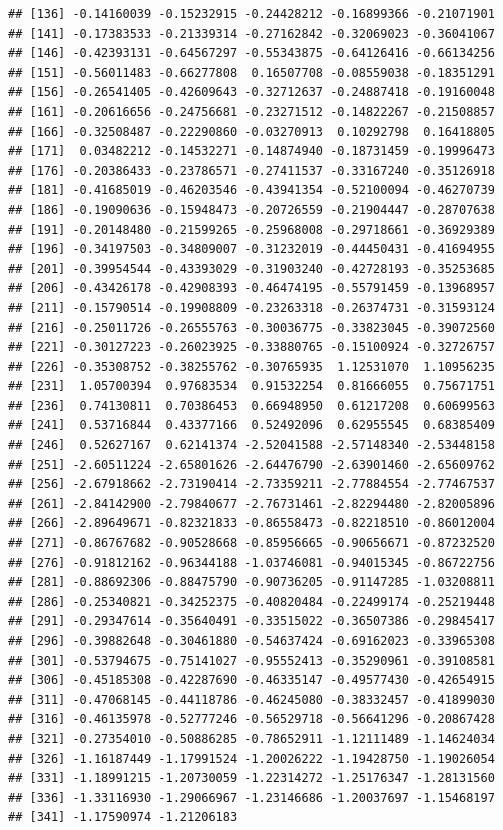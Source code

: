 \documentclass[]{gitbook}
\theoremstyle{definition}
\theoremstyle{definition}
\theoremstyle{definition}
\theoremstyle{remark}
\begin{document}
\begin{verbatim}
## [136] -0.14160039 -0.15232915 -0.24428212 -0.16899366 -0.21071901
## [141] -0.17383533 -0.21339314 -0.27162842 -0.32069023 -0.36041067
## [146] -0.42393131 -0.64567297 -0.55343875 -0.64126416 -0.66134256
## [151] -0.56011483 -0.66277808  0.16507708 -0.08559038 -0.18351291
## [156] -0.26541405 -0.42609643 -0.32712637 -0.24887418 -0.19160048
## [161] -0.20616656 -0.24756681 -0.23271512 -0.14822267 -0.21508857
## [166] -0.32508487 -0.22290860 -0.03270913  0.10292798  0.16418805
## [171]  0.03482212 -0.14532271 -0.14874940 -0.18731459 -0.19996473
## [176] -0.20386433 -0.23786571 -0.27411537 -0.33167240 -0.35126918
## [181] -0.41685019 -0.46203546 -0.43941354 -0.52100094 -0.46270739
## [186] -0.19090636 -0.15948473 -0.20726559 -0.21904447 -0.28707638
## [191] -0.20148480 -0.21599265 -0.25968008 -0.29718661 -0.36929389
## [196] -0.34197503 -0.34809007 -0.31232019 -0.44450431 -0.41694955
## [201] -0.39954544 -0.43393029 -0.31903240 -0.42728193 -0.35253685
## [206] -0.43426178 -0.42908393 -0.46474195 -0.55791459 -0.13968957
## [211] -0.15790514 -0.19908809 -0.23263318 -0.26374731 -0.31593124
## [216] -0.25011726 -0.26555763 -0.30036775 -0.33823045 -0.39072560
## [221] -0.30127223 -0.26023925 -0.33880765 -0.15100924 -0.32726757
## [226] -0.35308752 -0.38255762 -0.30765935  1.12531070  1.10956235
## [231]  1.05700394  0.97683534  0.91532254  0.81666055  0.75671751
## [236]  0.74130811  0.70386453  0.66948950  0.61217208  0.60699563
## [241]  0.53716844  0.43377166  0.52492096  0.62955545  0.68385409
## [246]  0.52627167  0.62141374 -2.52041588 -2.57148340 -2.53448158
## [251] -2.60511224 -2.65801626 -2.64476790 -2.63901460 -2.65609762
## [256] -2.67918662 -2.73190414 -2.73359211 -2.77884554 -2.77467537
## [261] -2.84142900 -2.79840677 -2.76731461 -2.82294480 -2.82005896
## [266] -2.89649671 -0.82321833 -0.86558473 -0.82218510 -0.86012004
## [271] -0.86767682 -0.90528668 -0.85956665 -0.90656671 -0.87232520
## [276] -0.91812162 -0.96344188 -1.03746081 -0.94015345 -0.86722756
## [281] -0.88692306 -0.88475790 -0.90736205 -0.91147285 -1.03208811
## [286] -0.25340821 -0.34252375 -0.40820484 -0.22499174 -0.25219448
## [291] -0.29347614 -0.35640491 -0.33515022 -0.36507386 -0.29845417
## [296] -0.39882648 -0.30461880 -0.54637424 -0.69162023 -0.33965308
## [301] -0.53794675 -0.75141027 -0.95552413 -0.35290961 -0.39108581
## [306] -0.45185308 -0.42287690 -0.46335147 -0.49577430 -0.42654915
## [311] -0.47068145 -0.44118786 -0.46245080 -0.38332457 -0.41899030
## [316] -0.46135978 -0.52777246 -0.56529718 -0.56641296 -0.20867428
## [321] -0.27354010 -0.50886285 -0.78652911 -1.12111489 -1.14624034
## [326] -1.16187449 -1.17991524 -1.20026222 -1.19428750 -1.19026054
## [331] -1.18991215 -1.20730059 -1.22314272 -1.25176347 -1.28131560
## [336] -1.33116930 -1.29066967 -1.23146686 -1.20037697 -1.15468197
## [341] -1.17590974 -1.21206183
\end{verbatim}
\end{document}
